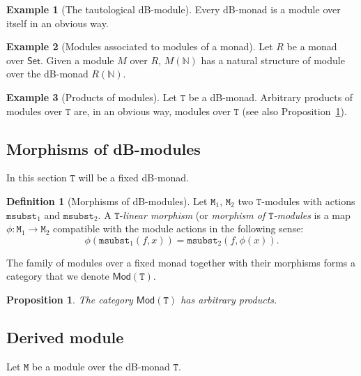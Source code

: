 \documentclass[a4paper,twoside,12pt,draft]{article}
\newtheorem{proposition}{Proposition}
\theoremstyle{definition}
\newtheorem{definition}{Definition}
\newtheorem{example}{Example}
\theoremstyle{remark}
\newcommand{\Category}[1]{\mathsf{#1}}
\newcommand{\SetCat}{\Category{Set}}
\newcommand{\NN}{\mathbb{N}}
\newcommand{\TT}{\mathtt{T}}
\newcommand{\MM}{\mathtt{M}}
\newcommand{\msubst}{\mathtt{msubst}}
\begin{document}
\begin{example}[The tautological dB-module]
  Every dB-monad is a module over itself in an obvious way.
\end{example}

\begin{example}[Modules associated to modules of a monad]
  Let $R$ be a monad over $\SetCat$.  Given a module $M$ over
  $R$, $M(\NN)$ has a natural structure of module over the dB-monad
  $R(\NN)$.
\end{example}

\begin{example}[Products of modules]
  Let $\TT$ be a dB-monad.  Arbitrary products of modules over $\TT$
  are, in an obvious way, modules over $\TT$ (see also
  Proposition~\ref{prop:modules-product}).
\end{example}

\subsection{Morphisms of dB-modules}
\label{sec:morphisms-db-modules}

In this section $\TT$ will be a fixed dB-monad.

\begin{definition}[Morphisms of dB-modules]
  Let $\MM_1$, $\MM_2$ two $\TT$-modules with actions $\msubst_1$ and
  $\msubst_2$.  A $\TT$-\emph{linear morphism} (or \emph{morphism of
    $\TT$-modules} is a map $\phi\colon \MM_1 \to \MM_2$ compatible
  with the module actions in the following sense:
  \begin{equation*}
    \phi(\msubst_1(f,x)) = \msubst_2(f,\phi(x)).
  \end{equation*}
\end{definition}

The family of modules over a fixed monad together with their morphisms
forms a category that we denote $\mathsf{Mod}(\TT)$.

\begin{proposition}
  \label{prop:modules-product}
  The category $\mathsf{Mod}(\TT)$ has arbitrary products.
\end{proposition}

\subsection{Derived module}
\label{sec:derived-module}

Let $\MM$ be a module over the dB-monad $\TT$.
\end{document}
